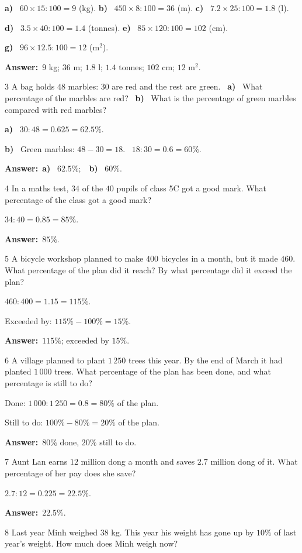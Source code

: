 \documentclass[11pt]{article}
\newif\ifsol \solfalse
\providecommand{\AnsWord}{Đáp số}
\newcommand{\dapso}[1]{\par\textbf{\AnsWord:}\ #1}
\newcommand{\probsol}[1]{%
  \begin{lrbox}{\solmeasure}\begin{minipage}{\dimexpr\linewidth-24pt\relax}#1\end{minipage}\end{lrbox}%
  \ifsol
    \begin{solbox}#1\end{solbox}%
  \else
    \setlength{\solht}{\dimexpr\ht\solmeasure+\dp\solmeasure+0.85cm\relax}%
    \ifdim\solht<1.35cm\setlength{\solht}{1.35cm}\fi
    \begin{tcolorbox}[colback=white,colframe=Line,boxrule=0.8pt,arc=5pt,
      left=8pt,right=8pt,top=4pt,bottom=4pt,height=\solht]{\footnotesize\color{Slate}\itshape\WorkWord}\end{tcolorbox}%
  \fi}
\newcommand{\pa}[1]{\textbf{#1)}\ }
\newcommand{\gap}{\vspace{0.3cm}}
\def\WorkWord{Your work:}
\def\AnsWord{Answer}
\begin{document}
\probsol{
\pa{a} $60\times15:100=9$ (kg). \quad \pa{b} $450\times8:100=36$ (m). \quad \pa{c} $7.2\times25:100=1.8$ (l).\par
\pa{d} $3.5\times40:100=1.4$ (tonnes). \quad \pa{e} $85\times120:100=102$ (cm).\par
\pa{g} $96\times12.5:100=12$ (m$^2$).
\dapso{$9$ kg; $36$ m; $1.8$ l; $1.4$ tonnes; $102$ cm; $12$ m$^2$.}}
\gap
\begin{probbox}{3}{\relax}
A bag holds $48$ marbles: $30$ are red and the rest are green. \ \pa{a} What percentage of the marbles are red? \ \pa{b} What is the percentage of green marbles compared with red marbles?
\end{probbox}
\probsol{
\pa{a} $30:48=0.625=62.5\%$.\par
\pa{b} Green marbles: $48-30=18$. \ $18:30=0.6=60\%$.
\dapso{\pa{a} $62.5\%$;\ \ \pa{b} $60\%$.}}
\gap
\begin{probbox}{4}{\relax}
In a maths test, $34$ of the $40$ pupils of class 5C got a good mark. What percentage of the class got a good mark?
\end{probbox}
\probsol{
$34:40=0.85=85\%$.
\dapso{$85\%$.}}
\gap
\begin{probbox}{5}{\relax}
A bicycle workshop planned to make $400$ bicycles in a month, but it made $460$. What percentage of the plan did it reach? By what percentage did it exceed the plan?
\end{probbox}
\probsol{
$460:400=1.15=115\%$.\par
Exceeded by: $115\%-100\%=15\%$.
\dapso{$115\%$; exceeded by $15\%$.}}
\gap
\begin{probbox}{6}{\relax}
A village planned to plant $1\,250$ trees this year. By the end of March it had planted $1\,000$ trees. What percentage of the plan has been done, and what percentage is still to do?
\end{probbox}
\probsol{
Done: $1\,000:1\,250=0.8=80\%$ of the plan.\par
Still to do: $100\%-80\%=20\%$ of the plan.
\dapso{$80\%$ done, $20\%$ still to do.}}
\gap
\begin{probbox}{7}{\relax}
Aunt Lan earns $12$ million dong a month and saves $2.7$ million dong of it. What percentage of her pay does she save?
\end{probbox}
\probsol{
$2.7:12=0.225=22.5\%$.
\dapso{$22.5\%$.}}
\gap
\begin{probbox}{8}{\relax}
Last year Minh weighed $38$ kg. This year his weight has gone up by $10\%$ of last year's weight. How much does Minh weigh now?
\end{probbox}
\end{document}
